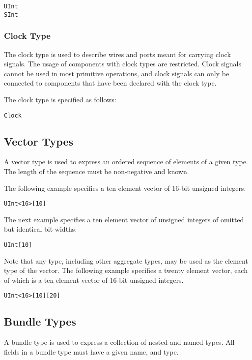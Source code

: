 \documentclass[12pt]{article}
\begin{document}
\begin{lstlisting}
UInt
SInt
\end{lstlisting}  

\subsubsection{Clock Type}

The clock type is used to describe wires and ports meant for carrying clock signals. The usage of components with clock types are restricted. Clock signals cannot be used in most primitive operations, and clock signals can only be connected to components that have been declared with the clock type. 

The clock type is specified as follows:
\begin{lstlisting}
Clock
\end{lstlisting}  

\subsection{Vector Types}

A vector type is used to express an ordered sequence of elements of a given type. The length of the sequence must be non-negative and known. 

The following example specifies a ten element vector of 16-bit unsigned integers.
\begin{lstlisting}
UInt<16>[10]
\end{lstlisting}  

The next example specifies a ten element vector of unsigned integers of omitted but identical bit widths.
\begin{lstlisting}
UInt[10]
\end{lstlisting}

Note that any type, including other aggregate types, may be used as the element type of the vector. The following example specifies a twenty element vector, each of which is a ten element vector of 16-bit unsigned integers.
\begin{lstlisting}
UInt<16>[10][20]
\end{lstlisting} 

\subsection{Bundle Types}

A bundle type is used to express a collection of nested and named types. All fields in a bundle type must have a given name, and type. 
\end{document}
